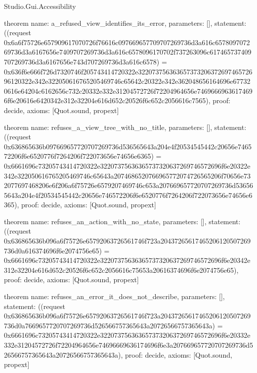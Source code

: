 \begin{lexlean}{Studio.Gui.Accessibility}
\begin{semanticmodule}
theorem{
  name: a_refused_view_identifies_its_error,
  parameters: [],
  statement: ((request 0x6a6f75726e657909617070726f76616c097669657709707269736d3a616c657809707269736d3a6167656e7409707269736d3a616c6578096170702f737263096c617465737409707269736d3a6167656e743d707269736d3a616c6578) = 0x636f6e666f726d7320746f205743414720322e32207375636365737320637269746572696120322e342e322050616765205469746c65642c20322e342e362048656164696e677320616e64204c6162656c732c20332e332e31204572726f72204964656e74696669636174696f6e20616e6420342e312e32204e616d652c20526f6c652c2056616c7565),
  proof: decide{},
  axioms: [Quot.sound, propext]
}

theorem{
  name: refuses_a_view_tree_with_no_title,
  parameters: [],
  statement: ((request 0x636865636b097669657720707269736d536565643a204e4f20534545442c20656e746572206f6e6520776f7264206f722073656e74656e6365) = 0x6661696c73205743414720322e32207375636365737320637269746572696f6e20322e342e322050616765205469746c65643a2074686520766965772074726565206f70656e732077697468206e6f206a6f75726e6579207469746c653a207669657720707269736d536565643a204e4f20534545442c20656e746572206f6e6520776f7264206f722073656e74656e6365),
  proof: decide{},
  axioms: [Quot.sound, propext]
}

theorem{
  name: refuses_an_action_with_no_state,
  parameters: [],
  statement: ((request 0x636865636b096a6f75726e65792063726561746f723a20437265617465206120507269736d0a616374696f6e2074756e65) = 0x6661696c73205743414720322e32207375636365737320637269746572696f6e20342e312e32204e616d652c20526f6c652c2056616c75653a20616374696f6e2074756e65),
  proof: decide{},
  axioms: [Quot.sound, propext]
}

theorem{
  name: refuses_an_error_it_does_not_describe,
  parameters: [],
  statement: ((request 0x636865636b096a6f75726e65792063726561746f723a20437265617465206120507269736d0a7669657720707269736d526566757365643a20726566757365643a) = 0x6661696c73205743414720322e32207375636365737320637269746572696f6e20332e332e31204572726f72204964656e74696669636174696f6e3a207669657720707269736d526566757365643a20726566757365643a),
  proof: decide{},
  axioms: [Quot.sound, propext]
}
\end{semanticmodule}
\end{lexlean}

